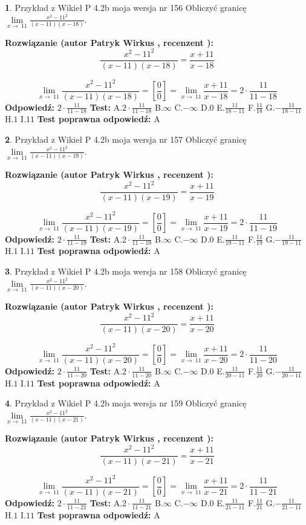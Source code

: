 \documentclass[12pt, a4paper]{article}
\theoremstyle{definition} %
\newtheorem{zad}{}
\newcommand{\zadStart}[1]{\begin{zad}#1\newline}
\newcommand{\zadStop}{\end{zad}}
\newcommand{\rozwStart}[2]{\noindent \textbf{Rozwiązanie (autor #1 , recenzent #2): }\newline}
\newcommand{\rozwStop}{\newline}
\newcommand{\odpStart}{\noindent \textbf{Odpowiedź:}\newline}
\newcommand{\odpStop}{\newline}
\newcommand{\testStart}{\noindent \textbf{Test:}\newline}
\newcommand{\testStop}{\newline}
\newcommand{\kluczStart}{\noindent \textbf{Test poprawna odpowiedź:}\newline}
\newcommand{\kluczStop}{\newline}
\begin{document}
\zadStart{Przykład z Wikieł P 4.2b moja wersja nr 156}
Obliczyć granicę $\lim\limits_{x\to\ 11}\frac{x^{2}-11^{2}}{(x-11)(x-18)}$.
\zadStop
\rozwStart{Patryk Wirkus}{}
$$\frac{x^{2}-11^{2}}{(x-11)(x-18)}=\frac{x+11}{x-18}$$

$$\lim\limits_{x\to\ 11}\frac{x^{2}-11^{2}}{(x-11)(x-18)}=[\frac{0}{0}]=\lim\limits_{x\to\ 11}\frac{x+11}{x-18}=2 \cdot \frac{11}{11-18}$$
\rozwStop
\odpStart
$2 \cdot \frac{11}{11-18}$
\odpStop
\testStart
A.$2 \cdot \frac{11}{11-18}$
B.$\infty$
C.$-\infty$
D.$0$
E.$\frac{11}{18-11}$
F.$\frac{11}{18}$
G.$-\frac{11}{18-11}$
H.$1$
I.$11$
\testStop
\kluczStart
A
\kluczStop



\zadStart{Przykład z Wikieł P 4.2b moja wersja nr 157}
Obliczyć granicę $\lim\limits_{x\to\ 11}\frac{x^{2}-11^{2}}{(x-11)(x-19)}$.
\zadStop
\rozwStart{Patryk Wirkus}{}
$$\frac{x^{2}-11^{2}}{(x-11)(x-19)}=\frac{x+11}{x-19}$$

$$\lim\limits_{x\to\ 11}\frac{x^{2}-11^{2}}{(x-11)(x-19)}=[\frac{0}{0}]=\lim\limits_{x\to\ 11}\frac{x+11}{x-19}=2 \cdot \frac{11}{11-19}$$
\rozwStop
\odpStart
$2 \cdot \frac{11}{11-19}$
\odpStop
\testStart
A.$2 \cdot \frac{11}{11-19}$
B.$\infty$
C.$-\infty$
D.$0$
E.$\frac{11}{19-11}$
F.$\frac{11}{19}$
G.$-\frac{11}{19-11}$
H.$1$
I.$11$
\testStop
\kluczStart
A
\kluczStop



\zadStart{Przykład z Wikieł P 4.2b moja wersja nr 158}
Obliczyć granicę $\lim\limits_{x\to\ 11}\frac{x^{2}-11^{2}}{(x-11)(x-20)}$.
\zadStop
\rozwStart{Patryk Wirkus}{}
$$\frac{x^{2}-11^{2}}{(x-11)(x-20)}=\frac{x+11}{x-20}$$

$$\lim\limits_{x\to\ 11}\frac{x^{2}-11^{2}}{(x-11)(x-20)}=[\frac{0}{0}]=\lim\limits_{x\to\ 11}\frac{x+11}{x-20}=2 \cdot \frac{11}{11-20}$$
\rozwStop
\odpStart
$2 \cdot \frac{11}{11-20}$
\odpStop
\testStart
A.$2 \cdot \frac{11}{11-20}$
B.$\infty$
C.$-\infty$
D.$0$
E.$\frac{11}{20-11}$
F.$\frac{11}{20}$
G.$-\frac{11}{20-11}$
H.$1$
I.$11$
\testStop
\kluczStart
A
\kluczStop



\zadStart{Przykład z Wikieł P 4.2b moja wersja nr 159}
Obliczyć granicę $\lim\limits_{x\to\ 11}\frac{x^{2}-11^{2}}{(x-11)(x-21)}$.
\zadStop
\rozwStart{Patryk Wirkus}{}
$$\frac{x^{2}-11^{2}}{(x-11)(x-21)}=\frac{x+11}{x-21}$$

$$\lim\limits_{x\to\ 11}\frac{x^{2}-11^{2}}{(x-11)(x-21)}=[\frac{0}{0}]=\lim\limits_{x\to\ 11}\frac{x+11}{x-21}=2 \cdot \frac{11}{11-21}$$
\rozwStop
\odpStart
$2 \cdot \frac{11}{11-21}$
\odpStop
\testStart
A.$2 \cdot \frac{11}{11-21}$
B.$\infty$
C.$-\infty$
D.$0$
E.$\frac{11}{21-11}$
F.$\frac{11}{21}$
G.$-\frac{11}{21-11}$
H.$1$
I.$11$
\testStop
\kluczStart
A
\kluczStop
\end{document}
